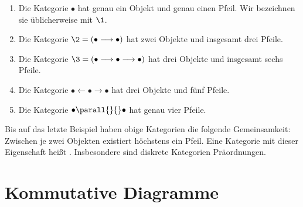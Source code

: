 \begin{bsp}
\begin{enumerate}
\item Die Kategorie $\bullet$ hat genau ein Objekt und genau einen Pfeil. Wir bezeichnen sie üblicherweise mit $\1$.
\item Die Kategorie $\2=(\bullet\longrightarrow\bullet)$ hat zwei Objekte und insgesamt drei Pfeile.
\item Die Kategorie $\3=(\bullet\longrightarrow\bullet\longrightarrow\bullet)$ hat drei Objekte und insgesamt sechs Pfeile.
\item Die Kategorie $\bullet\longleftarrow\bullet\longrightarrow\bullet$ hat drei Objekte und fünf Pfeile.
\item Die Kategorie $\bullet\parall{}{}\bullet$ hat genau vier Pfeile.
\end{enumerate}
\end{bsp}

Bis auf das letzte Beispiel haben obige Kategorien die folgende Gemeinsamkeit: Zwischen je zwei Objekten existiert höchstens ein Pfeil. Eine Kategorie mit dieser Eigenschaft heißt . Insbesondere sind diskrete Kategorien Präordnungen.

\section{Kommutative Diagramme}

